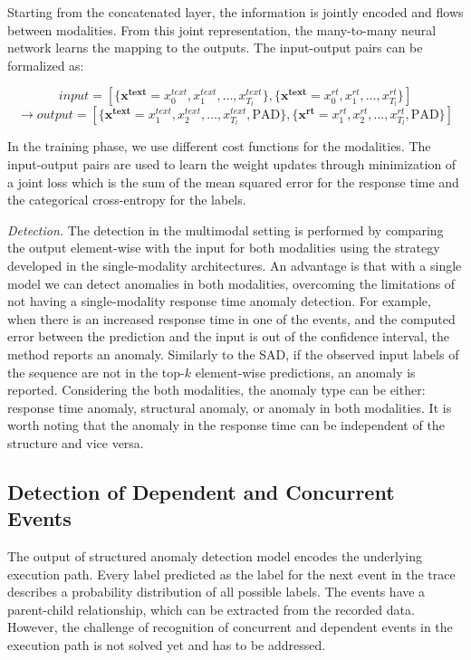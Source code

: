 Starting from the concatenated layer, the information is jointly encoded and flows between modalities. From this joint representation, the many-to-many neural network learns the mapping to the outputs. The input-output pairs can be formalized as:

$$input=[\{\mathbf{x^{text}}=x_0^{text}, x_1^{text}, \dots, x_{T_l}^{text}\}, \{\mathbf{x^{text}}=x_0^{rt}, x_1^{rt}, \dots, x_{T_l}^{rt} \}] $$
$$\rightarrow output=[\{\mathbf{x^{text}}=x_1^{text}, x_2^{text}, \dots, x_{T_l}^{text}, \mathrm{PAD}\}, \{\mathbf{x^{rt}}=x_1^{rt}, x_2^{rt}, \dots, x_{T_l}^{rt}, \mathrm{PAD}\}]$$

In the training phase, we use different cost functions for the modalities. The input-output pairs are used to learn the weight updates through minimization of a joint loss which is the sum of the mean squared error for the response time and the categorical cross-entropy for the labels. 

\emph{Detection.} The detection in the multimodal setting is performed by comparing the output element-wise with the input for both modalities using the strategy developed in the single-modality architectures. An advantage is that with a single model we can detect anomalies in both modalities, overcoming the limitations of not having a single-modality response time anomaly detection. For example, when there is an increased response time in one of the events, and the computed error between the prediction and the input is out of the confidence interval, the method reports an anomaly. Similarly to the SAD, if the observed input labels of the sequence are not in the top-$k$ element-wise predictions, an anomaly is reported. Considering the both modalities, the anomaly type can be either: response time anomaly, structural anomaly, or anomaly in both modalities. It is worth noting that the anomaly in the response time can be independent of the structure and vice versa.

\subsection{Detection of Dependent and Concurrent Events}
The output of structured anomaly detection model encodes the underlying execution path. Every label predicted as the label for the next event in the trace describes a probability distribution of all possible labels. The events have a parent-child relationship, which can be extracted from the recorded data. However, the challenge of recognition of concurrent and dependent events in the execution path is not solved yet and has to be addressed.

